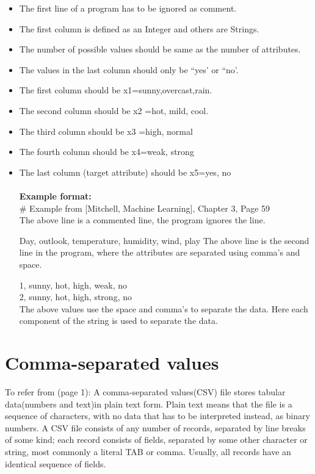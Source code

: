 \documentclass{report}
\begin{document}
\begin{itemize}

\item The first line of a program has to be ignored as comment.
\item The first column is defined as an Integer and others are Strings.
\item The number of possible values should be same as the number of attributes.
\item The values in the last column should only be ``yes' or ``no'.
\item The first column should be x1={sunny,overcast,rain}.
\item The second column should be x2 ={hot, mild, cool}.
\item The third column should be x3 ={high, normal}
\item The fourth column should be x4={weak, strong}
\item The last column (target attribute) should be x5={yes, no}\\\\


{\bf Example format:}\\
# Example from [Mitchell, Machine Learning], Chapter 3, Page 59\\
The above line is a commented line, the program ignores the line.

Day, outlook, temperature, humidity, wind, play
The above line is the second line in the program, where the attributes are separated using comma's and space. 
 
1, sunny, hot, high, weak, no\\
2, sunny, hot, high, strong, no\\

The above values use the space and comma's to separate the data. Here each component of the string is used to separate the data.


\end{itemize}


\section{Comma-separated values}
\label{sec:csv}

To refer from \cite{Wikipedia_CommaSeparatedValues}(page 1): A comma-separated values(CSV) file stores tabular data(numbers and text)in plain text form. Plain text means that the file is a sequence of characters, with no data that has to be interpreted instead, as binary numbers. A CSV file consists of any number of records, separated by line breaks of some kind; each record consists of fields, separated by some other character or string, most commonly a literal TAB or comma. Usually, all records have an identical sequence of fields.
\end{document}
